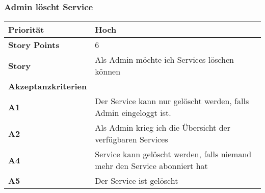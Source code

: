  \subsubsection{Admin löscht Service}
 
  \begin{tabularx}{\linewidth}{l X}
  \textbf{Priorität} & Hoch\\
  \hline
  \textbf{Story Points} & 6\\
  \hline
  \textbf{Story}& Als Admin möchte ich Services löschen können\\
  \hline
    \textbf{Akzeptanzkriterien} & \\
    \hline
      \textbf{A1} & Der Service kann nur gelöscht werden, falls Admin eingeloggt ist.\\
  \hline
  \textbf{A2} & Als Admin krieg ich die Übersicht der verfügbaren Services\\
  \hline
  \textbf{A4} & Service kann gelöscht werden, falls niemand mehr den Service abonniert hat\\
  \hline
    \textbf{A5} & Der Service ist gelöscht\\
  \hline
 \end{tabularx}
